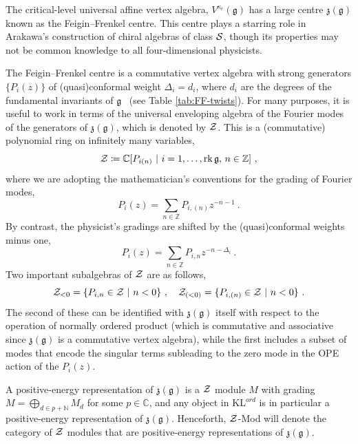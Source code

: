 \documentclass[a4paper]{article}
\def\IC{\mathbb{C}}
\def\IN{\mathbb{N}}
\def\IZ{\mathbb{Z}}
\def\SS{{\cal S}}
\def\ZZ{{\cal Z}}
\def\gf{\mathfrak{g}}
\def \zf{\mathfrak{z}}
\def \KL{\mathrm{KL}}
\begin{document}
The critical-level universal affine vertex algebra, $V^{\kappa_c}(\gf)$ has a large centre $\zf(\gf)$ known as the Feigin--Frenkel centre. This centre plays a starring role in Arakawa's construction of chiral algebras of class $\SS$, though its properties may not be common knowledge to all four-dimensional physicists.

The Feigin--Frenkel centre is a commutative vertex algebra with strong generators $\{P_i(z)\}$ of (quasi)conformal weight $\Delta_i = d_i$, where $d_i$ are the degrees of the fundamental invariants of $\gf$~\cite{Frenkel:2007} (see Table \ref{tab:FF-twists}). For many purposes, it is useful to work in terms of the universal enveloping algebra of the Fourier modes of the generators of $\zf(\gf)$, which is denoted by $\ZZ$. This is a (commutative) polynomial ring on infinitely many variables,
\begin{equation}
	\ZZ \coloneqq \IC[P_{i(n)}~|~i=1,\dots,\mathrm{rk}\,\gf,\, n\in\IZ]~,
\end{equation}
where we are adopting the mathematician's conventions for the grading of Fourier modes,
\begin{equation}
	P_i(z) = \sum_{n\in\IZ}P_{i,(n)}z^{-n-1}~.
\end{equation}
By contrast, the physicist's gradings are shifted by the (quasi)conformal weights minus one,
\begin{equation}
	P_i(z) = \sum_{n\in\IZ}P_{i,n}z^{-n-\Delta_i}~.
\end{equation}
Two important subalgebras of $\ZZ$ are as follows,
\begin{equation}
	\ZZ_{<0}=\{P_{i,n}\in\ZZ ~|~ n<0\}~, \quad \ZZ_{(<0)} = \{P_{i,(n)}\in\ZZ ~|~ n<0\}~.
\end{equation}
The second of these can be identified with $\zf(\gf)$ itself with respect to the operation of normally ordered product (which is commutative and associative since $\zf(\gf)$ is a commutative vertex algebra), while the first includes a subset of modes that encode the singular terms subleading to the zero mode in the OPE action of the $P_i(z)$.


A positive-energy representation of $\zf(\gf)$ is a $\ZZ$ module $M$ with grading $M=\bigoplus_{d\in p+\IN} M_d$ for some $p\in\IC$, and any object in $\KL^{ord}$ is in particular a positive-energy representation of $\zf(\gf)$. Henceforth, $\ZZ$-Mod will denote the category of $\ZZ$ modules that are positive-energy representations of $\zf(\gf)$.
\end{document}
